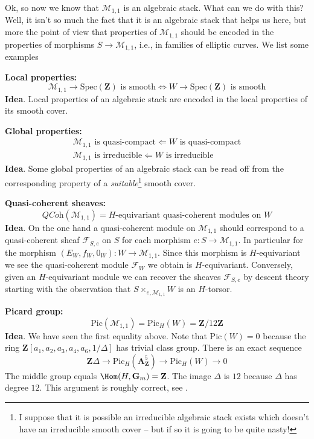 \noindent
Ok, so now we know that $\mathcal{M}_{1, 1}$ is an algebraic
stack. What can we do with this? Well, it isn't so much the fact that it
is an algebraic stack that helps us here, but more the point of view that
properties of $\mathcal{M}_{1, 1}$ should be encoded in the properties
of morphisms $S \to \mathcal{M}_{1, 1}$, i.e., in families of elliptic
curves. We list some examples

\medskip\noindent
{\bf Local properties:}
$$
\mathcal{M}_{1, 1} \to \text{Spec}(\mathbf{Z})\text{ is smooth}
\Leftrightarrow
W \to \text{Spec}(\mathbf{Z})\text{ is smooth}
$$
{\bf Idea}. Local properties of an algebraic stack are encoded in the local
properties of its smooth cover.

\medskip\noindent
{\bf Global properties:}
$$
\begin{matrix}
\mathcal{M}_{1, 1}\text{ is quasi-compact} \Leftarrow W\text{ is quasi-compact}
\\
\mathcal{M}_{1, 1}\text{ is irreducible} \Leftarrow W\text{ is irreducible}
\end{matrix}
$$
{\bf Idea}. Some global properties of an algebraic stack can be read off
from the corresponding property of a {\it suitable}\footnote{I suppose that
it is possible an irreducible algebraic stack exists which doesn't have an
irreducible smooth cover -- but if so it is going to be quite nasty!}
smooth cover.

\medskip\noindent
{\bf Quasi-coherent sheaves:}
$$
\textit{QCoh}(\mathcal{M}_{1, 1})
=
H\text{-equivariant quasi-coherent modules on }W
$$
{\bf Idea}. On the one hand a quasi-coherent module on $\mathcal{M}_{1, 1}$
should correspond to a quasi-coherent sheaf $\mathcal{F}_{S, e}$ on $S$
for each morphism $e : S \to \mathcal{M}_{1, 1}$. In particular for the
morphism $(E_W, f_W, 0_W) :  W \to \mathcal{M}_{1, 1}$. Since this morphism is
$H$-equivariant we see the quasi-coherent module $\mathcal{F}_W$ we obtain is
$H$-equivariant. Conversely, given an $H$-equivariant module we can recover
the  sheaves $\mathcal{F}_{S, e}$ by descent theory starting with the
observation that $S \times_{e, \mathcal{M}_{1, 1}} W$ is an $H$-torsor.

\medskip\noindent
{\bf Picard group:}
$$
\text{Pic}(\mathcal{M}_{1, 1}) = \text{Pic}_H(W) = \mathbf{Z}/12\mathbf{Z}
$$
{\bf Idea}. We have seen the first equality above. Note that
$\text{Pic}(W) = 0$ because the ring
$\mathbf{Z}[a_1, a_2, a_3, a_4, a_6, 1/\Delta]$
has trivial class group.
There is an exact sequence
$$
\mathbf{Z}\Delta \to
\text{Pic}_H(\mathbf{A}^5_{\mathbf{Z}}) \to
\text{Pic}_H(W) \to 0
$$
The middle group equals $\Hom(H, \mathbf{G}_m) = \mathbf{Z}$.
The image $\Delta$ is $12$ because $\Delta$ has degree $12$.
This argument is roughly correct, see \cite{PicM11}.


